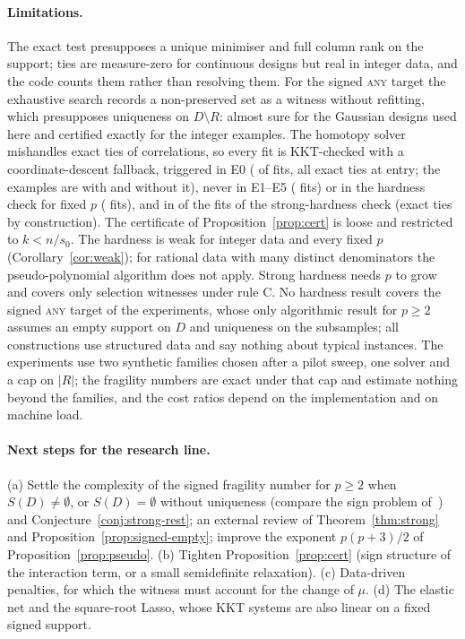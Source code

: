 \documentclass[10pt,a4paper]{article}
\theoremstyle{plain}
\theoremstyle{definition}
\theoremstyle{remark}
\newcommand{\Dm}{D\setminus R}
\newcommand{\tsc}[1]{\textnormal{\textsc{#1}}}  %
\begin{document}
\paragraph{Limitations.} The exact test presupposes a unique minimiser and full column rank on the support; ties are measure-zero for continuous designs but real in integer data, and the code counts them rather than resolving them. For the signed \tsc{any} target the exhaustive search records a non-preserved set as a witness without refitting, which presupposes uniqueness on $\Dm$: almost sure for the Gaussian designs used here and certified exactly for the integer examples. The homotopy solver mishandles exact ties of correlations, so every fit is KKT-checked with a coordinate-descent fallback, triggered in E0 (\EzeroFallbacks{} of \EzeroFits{} fits, all exact ties at entry; the examples are \EzeroGuardIdentical{} with and without it), never in E1--E5 (\EoneToFiveFits{} fits) or in the hardness check for fixed $p$ (\HardKKTFits{} fits), and in \StrongKKTFallbacks{} of the \StrongKKTCalls{} fits of the strong-hardness check (exact ties by construction). The certificate of Proposition~\ref{prop:cert} is loose and restricted to $k<n/s_0$. The hardness is weak for integer data and every fixed $p$ (Corollary~\ref{cor:weak}); for rational data with many distinct denominators the pseudo-polynomial algorithm does not apply. Strong hardness needs $p$ to grow and covers only selection witnesses under rule C. No hardness result covers the signed \tsc{any} target of the experiments, whose only algorithmic result for $p\ge2$ assumes an empty support on $D$ and uniqueness on the subsamples; all constructions use structured data and say nothing about typical instances. The experiments use two synthetic families chosen after a pilot sweep, one solver and a cap on $|R|$; the fragility numbers are exact under that cap and estimate nothing beyond the families, and the cost ratios depend on the implementation and on machine load.

\paragraph{Next steps for the research line.} (a) Settle the complexity of the signed fragility number for $p\ge2$ when $S(D)\ne\emptyset$, or $S(D)=\emptyset$ without uniqueness (compare the sign problem of~\citet{moitra2022}) and Conjecture~\ref{conj:strong-rest}; an external review of Theorem~\ref{thm:strong} and Proposition~\ref{prop:signed-empty}; improve the exponent $p(p+3)/2$ of Proposition~\ref{prop:pseudo}. (b) Tighten Proposition~\ref{prop:cert} (sign structure of the interaction term, or a small semidefinite relaxation). (c) Data-driven penalties, for which the witness must account for the change of $\mu$. (d) The elastic net and the square-root Lasso, whose KKT systems are also linear on a fixed signed support.
\end{document}
